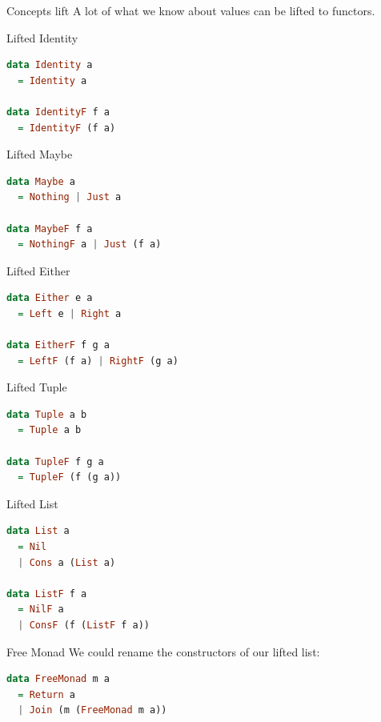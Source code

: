 \documentclass[utf8x,notes,17pt]{beamer}
\begin{document}
\begin{frame}[fragile,label=sec-13-24]{Concepts lift}
A lot of what we know about values can be lifted to functors.
\end{frame}
\begin{frame}[fragile,label=sec-13-25]{Lifted Identity}
\begin{lstlisting}[language=Haskell]
data Identity a
  = Identity a

data IdentityF f a
  = IdentityF (f a)
\end{lstlisting}
\end{frame}
\begin{frame}[fragile,label=sec-13-26]{Lifted Maybe}
\begin{lstlisting}[language=Haskell]
data Maybe a
  = Nothing | Just a

data MaybeF f a
  = NothingF a | Just (f a)
\end{lstlisting}
\end{frame}
\begin{frame}[fragile,label=sec-13-27]{Lifted Either}
\begin{lstlisting}[language=Haskell]
data Either e a
  = Left e | Right a

data EitherF f g a
  = LeftF (f a) | RightF (g a)
\end{lstlisting}
\end{frame}
\begin{frame}[fragile,label=sec-13-28]{Lifted Tuple}
\begin{lstlisting}[language=Haskell]
data Tuple a b
  = Tuple a b

data TupleF f g a
  = TupleF (f (g a))
\end{lstlisting}
\end{frame}
\begin{frame}[fragile,label=sec-13-29]{Lifted List}
\begin{lstlisting}[language=Haskell]
data List a
  = Nil
  | Cons a (List a)

data ListF f a
  = NilF a
  | ConsF (f (ListF f a))
\end{lstlisting}
\end{frame}
\begin{frame}[fragile,label=sec-13-30]{Free Monad}
We could rename the constructors of our lifted list:

\vspace{2ex}
\begin{lstlisting}[language=Haskell]
data FreeMonad m a
  = Return a
  | Join (m (FreeMonad m a))
\end{lstlisting}
\end{frame}
\end{document}
